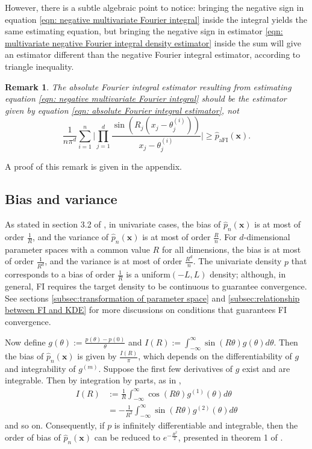 \documentclass[%
 reprint,
 amsmath,amssymb,
 aps,
]{revtex4-2}
\newtheorem{remark}[theorem]{Remark}
\begin{document}
However, there is a subtle algebraic point to notice: bringing the negative sign in equation \eqref{eqn: negative multivariate Fourier integral} inside the integral yields the same estimating equation, but bringing the negative sign in estimator \eqref{eqn: multivariate negative Fourier integral density estimator} inside the sum will give an estimator different than the negative Fourier integral estimator, according to triangle inequality.
\begin{remark} \label{remark: triangle inequality in aFI}
    The absolute Fourier integral estimator resulting from estimating equation \eqref{eqn: negative multivariate Fourier integral} should be the estimator given by equation \eqref{eqn: absolute Fourier integral estimator}, not
    \begin{equation*}
        \frac{1}{n\pi^d}\sum_{i = 1}^n \bigg|\prod_{j = 1}^d \frac{\sin(R_j(x_j - \theta_j^{(i)}))}{x_j - \theta_j^{(i)}}\bigg| \ge \hat{p}_\text{aFI}(\mathbf{x}).
    \end{equation*}
\end{remark}
A proof of this remark is given in the appendix.

%
\subsection{\label{subsec2:FI bias and variance} Bias and variance}
%
As stated in section 3.2 of \cite{rotiroti2022computing}, in univariate cases, the bias of $\hat{p}_n(\mathbf{x})$ is at most of order $\frac{1}{R}$, and the variance of $\hat{p}_n(\mathbf{x})$ is at most of order $\frac{R}{n}$. For $d$-dimensional parameter spaces with a common value $R$ for all dimensions, the bias is at most of order $\frac{1}{R^d}$, and the variance is at most of order $\frac{R^d}{n}$. The univariate density $p$ that corresponds to a bias of order $\frac{1}{R}$ is a uniform$(-L, L)$ density; although, in general, FI requires the target density to be continuous to guarantee convergence. See sections \ref{subsec:transformation of parameter space} and \ref{subsec:relationship between FI and KDE} for more discussions on conditions that guarantees FI convergence.

Now define $\displaystyle g(\theta) := \frac{p(\theta) - p(0)}{\theta}$ and $\displaystyle I(R) := \int_{-\infty}^\infty \sin(R\theta)g(\theta)d\theta$. Then the bias of $\hat{p}_n(\mathbf{x})$ is given by $\displaystyle \frac{I(R)}{\pi}$, which depends on the differentiability of $g$ and integrability of $g^{(m)}$. Suppose the first few derivatives of $g$ exist and are integrable. Then by integration by parts, as in \cite{rotiroti2022computing},
\begin{align*}
    I(R) & := \frac{1}{R} \int_{-\infty}^\infty \cos(R\theta)g^{(1)}(\theta)d\theta \\
    & = -\frac{1}{R^2} \int_{-\infty}^\infty \sin(R\theta)g^{(2)}(\theta)d\theta
\end{align*}
and so on. Consequently, if $p$ is infinitely differentiable and integrable, then the order of bias of $\hat{p}_n(\mathbf{x})$ can be reduced to $e^{-\frac{R^2}{2}}$, presented in theorem 1 of \cite{rotiroti2022computing}.
\end{document}
